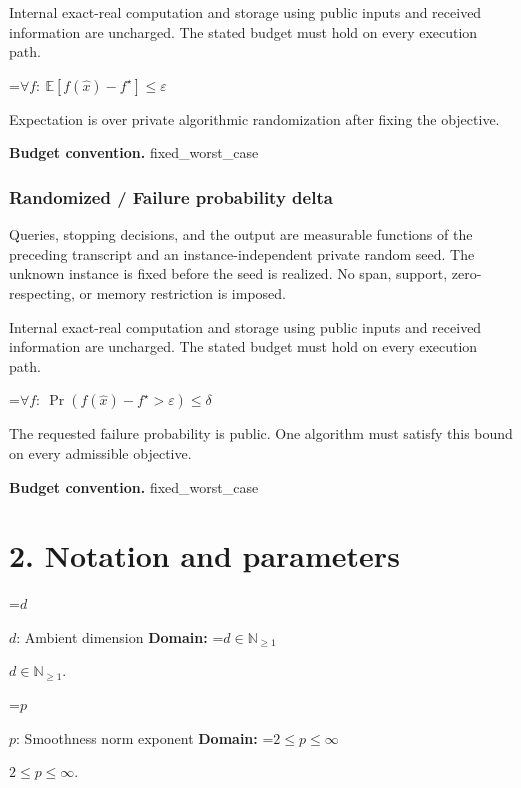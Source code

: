 \documentclass[10pt,a4paper]{article}
\newcommand{\AtlasMath}[1]{\par\begingroup\centering\setbox0=\hbox{$\displaystyle #1$}\ifdim\wd0>1.4\linewidth\typeout{ATLAS WIDE FORMULA: \the\wd0}\fi\ifdim\wd0>\linewidth\resizebox{\linewidth}{!}{\box0}\else\box0\fi\par\endgroup}
\newcommand{\AtlasInlineMath}[1]{\begingroup\setbox0=\hbox{$#1$}\ifdim\wd0>.4\linewidth\endgroup\AtlasMath{#1}\else\endgroup$#1$\fi}
\begin{document}
Internal exact-real computation and storage using public inputs and received information are uncharged. The stated budget must hold on every execution path.




\AtlasMath{\forall f:\ \mathbb E[f(\widehat x)-f^\star]\le\varepsilon}




Expectation is over private algorithmic randomization after fixing the objective.



\textbf{Budget convention.} fixed\_worst\_case



\subsubsection{Randomized / Failure probability delta}


Queries, stopping decisions, and the output are measurable functions of the preceding transcript and an instance-independent private random seed. The unknown instance is fixed before the seed is realized. No span, support, zero-respecting, or memory restriction is imposed.



Internal exact-real computation and storage using public inputs and received information are uncharged. The stated budget must hold on every execution path.




\AtlasMath{\forall f:\ \Pr(f(\widehat x)-f^\star>\varepsilon)\le\delta}




The requested failure probability is public. One algorithm must satisfy this bound on every admissible objective.



\textbf{Budget convention.} fixed\_worst\_case



\section{2. Notation and parameters}


\AtlasInlineMath{d}: Ambient dimension \textbf{Domain:} \AtlasInlineMath{d\in\mathbb N_{\ge1}}.



\AtlasInlineMath{p}: Smoothness norm exponent \textbf{Domain:} \AtlasInlineMath{2\le p\le\infty}.
\end{document}

